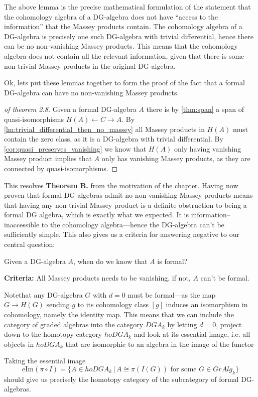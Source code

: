 The above lemma is the precise mathematical formulation of the statement that the cohomology algebra of a DG-algebra does not have ``access to the information'' that the Massey products contain. The cohomology algebra of a DG-algebra is precisely one such DG-algebra with trivial differential, hence there can be no non-vanishing Massey products. This means that the cohomology algebra does not contain all the relevant information, given that there is some non-trivial Massey products in the original DG-algebra. 

Ok, lets put these lemmas together to form the proof of the fact that a formal DG-algebra can have no non-vanishing Massey products. 

\begin{proof}[of theorem 2.8]
Given a formal DG-algebra $A$ there is by \cref{thm:span} a span of quasi-isomorphisms $H(A)\longleftarrow C\longrightarrow A$. By \cref{lm:trivial_differential_then_no_massey} all Massey products in $H(A)$ must contain the zero class, as it is a DG-algebra with trivial differential. By \cref{cor:quasi_preserves_vanishing} we know that $H(A)$ only having vanishing Massey product implies that $A$ only has vanishing Massey products, as they are connected by quasi-isomorphisms. 
\end{proof}

This resolves \textbf{Theorem B.} from the motivation of the chapter. Having now proven that formal DG-algebras admit no non-vanishing Massey products means that having any non-trivial Massey product is a definite obstruction to being a formal DG algebra, which is exactly what we expected. It is information--inaccessible to the cohomology algebra---hence the DG-algebra can't be sufficiently simple. This also 	gives us a criteria for answering negative to our central question: 

\begin{central}
Given a DG-algebra $A$, when do we know that $A$ is formal?
\end{central}
\textbf{Criteria:} All Massey products needs to be vanishing, if not, $A$ can't be formal. 

Notethat any DG-algebra $G$ with $d=0$ must be formal---as the map $G\longrightarrow H(G)$ sending $g$ to its cohomology class $[g]$ induces an isomorphism in cohomology, namely the identity map. This means that we can include the category of graded algebras into the category $DGA_k$ by letting $d=0$, project down to the homotopy category $hoDGA_k$ and look at its essential image, i.e. all objects in $hoDGA_k$ that are isomorphic to an algebra in the image of the functor
\begin{center}
\end{center}
Taking the essential image
\begin{equation*}
    \text{eIm}(\pi\circ I) = \{A\in hoDGA_k \,\vert\, A\cong \pi( I(G)) \text{ for some } G\in GrAlg_k\}
\end{equation*}
should give us precisely the homotopy category of the subcategory of formal DG-algebras. 

